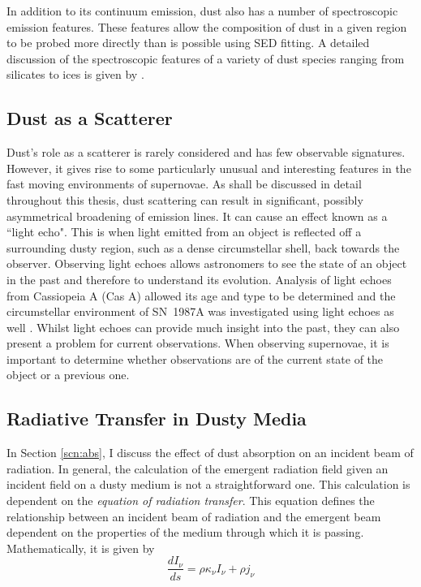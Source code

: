 In addition to its continuum emission, dust also has a number of spectroscopic emission features.  These features allow the composition of dust in a given region to be probed more directly than is possible using SED fitting.  A detailed discussion of the spectroscopic features of a variety of dust species ranging from silicates to ices is given by \citet{Draine2003}. 

\subsection{Dust as a Scatterer}

Dust's role as a scatterer is rarely considered and has few observable signatures.  However, it gives rise to some particularly unusual and interesting features in the fast moving environments of supernovae.  As shall be discussed in detail throughout this thesis, dust scattering can result in significant, possibly asymmetrical broadening of emission lines.  It can cause an effect known as a ``light echo".  This is when light emitted from an object is reflected off a surrounding dusty region, such as a dense circumstellar shell, back towards the observer. Observing light echoes allows astronomers to see the state of an object in the past and therefore to understand its evolution.  Analysis of light echoes from Cassiopeia A (Cas A) allowed its age and type to be determined \citep{Krause2008} and the circumstellar environment of SN~1987A was investigated using light echoes as well \citep{Sugerman2005}.  Whilst light echoes can provide much insight into the past, they can also present a problem for current observations.  When observing supernovae, it is important to determine whether observations are of the current state of the object or a previous one.

\subsection{Radiative Transfer in Dusty Media}

In Section \ref{scn:abs}, I discuss the effect of dust absorption on an incident beam of radiation.  In general, the calculation of the emergent radiation field given an incident field on a dusty medium is not a straightforward one.  This calculation is dependent on the {\em equation of radiation transfer}.  This equation defines the relationship between an incident beam of radiation and the emergent beam dependent on the properties of the medium through which it is passing.  Mathematically, it is given by 
\begin{equation}
\label{eqn:rt}
\frac{dI_{\nu}}{ds}=\rho \kappa_{\nu} I_{\nu} + \rho j_{\nu}
\end{equation}
 
